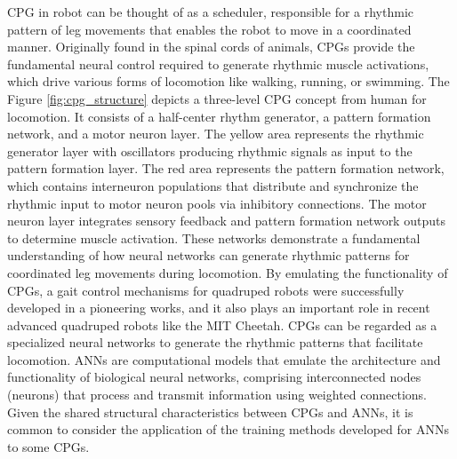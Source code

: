 \ac{CPG} in robot can be thought of as a scheduler, responsible for a rhythmic pattern of leg movements that enables the robot to move in a coordinated manner. Originally found in the spinal cords of animals, \ac{CPG}s provide the fundamental neural control required to generate rhythmic muscle activations, which drive various forms of locomotion like walking, running, or swimming. The Figure \ref{fig:cpg_structure} depicts a three-level \ac{CPG} concept from human for locomotion. It consists of a half-center rhythm generator, a pattern formation network, and a motor neuron layer. The yellow area represents the rhythmic generator layer with oscillators producing rhythmic signals as input to the pattern formation layer. The red area represents the pattern formation network, which contains interneuron populations that distribute and synchronize the rhythmic input to motor neuron pools via inhibitory connections. The motor neuron layer integrates sensory feedback and pattern formation network outputs to determine muscle activation. These networks demonstrate a fundamental understanding of how neural networks can generate rhythmic patterns for coordinated leg movements during locomotion. By emulating the functionality of \ac{CPG}s, a gait control mechanisms for quadruped robots were successfully developed in a pioneering works\cite{sprowitz2013Dynamic}, and it also plays an important role in recent advanced quadruped robots like the MIT Cheetah\cite{dicarlo2018Dynamic}. \ac{CPG}s can be regarded as a specialized neural networks to generate the rhythmic patterns that facilitate locomotion. \ac{ANN}s are computational models that emulate the architecture and functionality of biological neural networks, comprising interconnected nodes (neurons) that process and transmit information using weighted connections. Given the shared structural characteristics between \ac{CPG}s and \ac{ANN}s, it is common to consider the application of the training methods developed for \ac{ANN}s to some \ac{CPG}s. 


